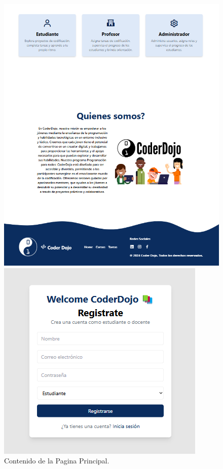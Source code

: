 \documentclass{article}
\begin{document}
\begin{figure}[H]
	\centering
	\begin{minipage}{0.45\textwidth}
		\centering
		\includegraphics[width=\textwidth,keepaspectratio]{img/homeMain.png}
	\caption{Contenido de la Pagina Principal.}
	\end{minipage}
	\hfill
	\begin{minipage}{0.45\textwidth}
		\centering
		\includegraphics[width=\textwidth,keepaspectratio]{img/register.png}

\end{minipage}
\end{figure}
\end{document}
